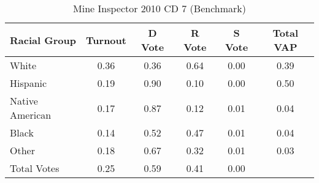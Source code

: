 \begin{table}[htb]
\begin{center}
\caption{Mine Inspector 2010 CD 7 (Benchmark)}
\label{smine_vap_cd_7_benchmark}
\begin{tabular}{lccccc}
  \hline
Racial Group & Turnout & D Vote & R Vote & S Vote & Total VAP \\ 
  \hline
White & 0.36 & 0.36 & 0.64 & 0.00 & 0.39 \\ 
  Hispanic & 0.19 & 0.90 & 0.10 & 0.00 & 0.50 \\ 
  Native American & 0.17 & 0.87 & 0.12 & 0.01 & 0.04 \\ 
  Black & 0.14 & 0.52 & 0.47 & 0.01 & 0.04 \\ 
  Other & 0.18 & 0.67 & 0.32 & 0.01 & 0.03 \\ 
  Total Votes & 0.25 & 0.59 & 0.41 & 0.00 &  \\ 
   \hline
\end{tabular}
\end{center}
\end{table}

